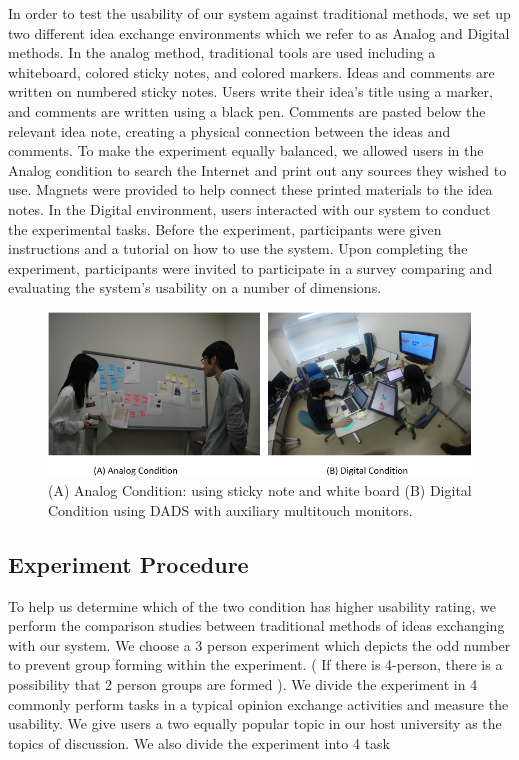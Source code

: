 \documentclass{sigchi}
\begin{document}
\begin{itemize}
\begin{itemize}
In order to test the usability of our system against traditional methods, we set up two different idea exchange environments which we refer to as Analog and Digital methods. In the analog method, traditional tools are used including a whiteboard, colored sticky notes, and colored markers. Ideas and comments are written on numbered sticky notes. Users write their idea's title using a marker, and comments are written using a black pen. Comments are pasted below the relevant idea note, creating a physical connection between the ideas and comments. To make the experiment equally balanced, we allowed users in the Analog condition to search the Internet and print out any sources they wished to use. Magnets were provided to help connect these printed materials to the idea notes. In the Digital environment, users interacted with our system to conduct the experimental tasks. Before the experiment, participants were given instructions and a tutorial on how to use the system. Upon completing the experiment, participants were invited to participate in a survey comparing and evaluating the system's usability on a number of dimensions.

\begin{figure}[!h]
\centering
\includegraphics[width=1.0\columnwidth]{condition}
\caption{(A) Analog Condition: using sticky note and white board (B) Digital Condition using DADS with auxiliary multitouch monitors.}
\label{fig:figure1}
\end{figure}


\subsection{Experiment Procedure}

To help us determine which of the two condition has higher usability rating, we perform the comparison studies between  traditional methods of ideas exchanging  with our system. We choose a 3 person experiment which depicts the odd number to prevent group forming within the experiment. ( If there is 4-person, there is a possibility that 2 person groups are formed ). We divide the experiment in 4 commonly perform tasks in a typical opinion exchange activities and measure the usability.  We give users a two equally popular topic in our host university as the topics of discussion. We also divide the experiment into 4 task


\end{itemize}
\end{itemize}
\end{document}
